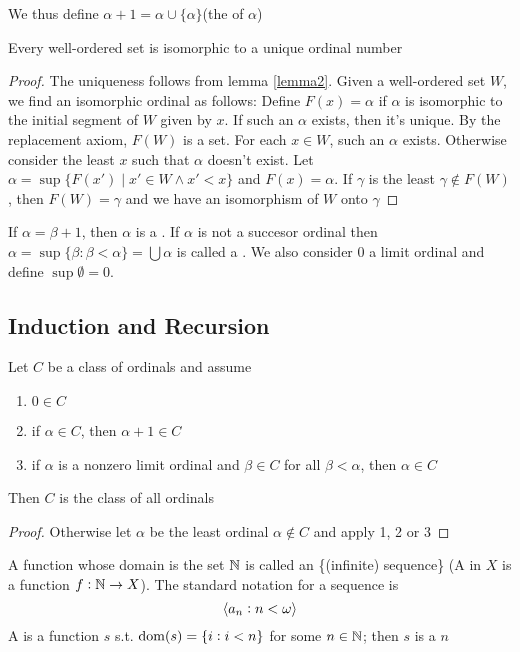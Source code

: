\documentclass[11pt]{article}
\begin{document}
We thus define \(\alpha+1=\alpha\cup\{\alpha\}\)(the  of \(\alpha\)) 

\begin{theorem}[]
Every well-ordered set is isomorphic to a unique ordinal number
\end{theorem}

\begin{proof}
The uniqueness follows from lemma \ref{lemma2}. Given a well-ordered set \(W\),
we find an isomorphic ordinal as follows: Define \(F(x)=\alpha\) if \(\alpha\) is
isomorphic to the initial segment of \(W\) given by \(x\). If such an \(\alpha\)
exists, then it's unique. By the replacement axiom, \(F(W)\) is a set. For each
\(x\in W\), such an \(\alpha\) exists. Otherwise consider the least \(x\) such that
\(\alpha\) doesn't exist. Let \(\alpha=\sup\{F(x')\mid x'\in W\wedge x' <x\}\) and
\(F(x)=\alpha\). If \(\gamma\) is the least \(\gamma\not\in F(W)\), then
\(F(W)=\gamma\) and we have an isomorphism of \(W\) onto \(\gamma\)
\end{proof}

If \(\alpha=\beta+1\), then \(\alpha\) is a . If \(\alpha\) is not
a succesor ordinal then \(\alpha=\sup\{\beta:\beta<\alpha\}=\bigcup\alpha\) is
called a . We also consider 0 a limit ordinal and define
\(\sup\emptyset=0\).

\subsection{Induction and Recursion}
\label{sec:orgc895cac}
\begin{theorem}
Let \(C\) be a class of ordinals and assume
\begin{enumerate}
\item \(0\in C\)
\item if \(\alpha\in C\), then \(\alpha+1\in C\)
\item if \(\alpha\) is a nonzero limit ordinal and \(\beta\in C\) for all
\(\beta<\alpha\), then \(\alpha\in C\)
\end{enumerate}


Then \(C\) is the class of all ordinals
\end{theorem}

\begin{proof}
Otherwise let \(\alpha\) be the least ordinal \(\alpha\not\in C\) and apply 1, 2 or 3
\end{proof}

A function whose domain is the set \(\mathbb{N}\) is called an \tf\{(infinite)
sequence\} (A  in \(X\) is a function \(f:\mathbb{N}\to X\)). The standard
notation for a sequence is
\begin{equation*}
\langle a_n:n<\omega\rangle
\end{equation*}
A  is a function \(s\) s.t. \(\mathrm{dom}{(s)}=\{i:i<n\}\) for some
\(n\in\mathbb{N}\); then \(s\) is a  \(n\)
\end{document}
